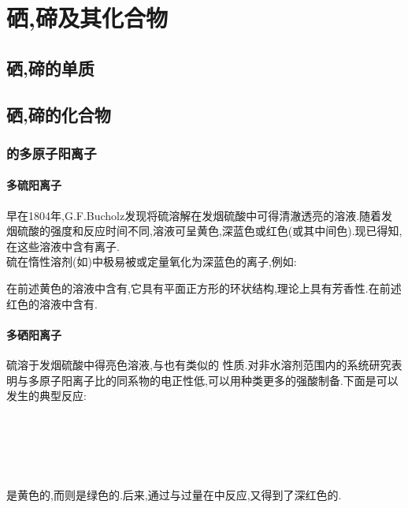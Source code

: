 \documentclass{ctexart}
\begin{document}
\section{硒,碲及其化合物}
\subsection{硒,碲的单质}
\subsection{硒,碲的化合物}
\subsubsection{的多原子阳离子}
\paragraph{多硫阳离子}早在1804年,G.F.Bucholz发现将硫溶解在发烟硫酸中可得清澈透亮的溶液.随着发烟硫酸的强度和反应时间不同,溶液可呈黄色,深蓝色或红色(或其中间色).现已得知,在这些溶液中含有离子.\\
\indent 硫在惰性溶剂(如)中极易被或定量氧化为深蓝色的离子,例如:
\begin{center}
\end{center}
在前述黄色的溶液中含有,它具有平面正方形的环状结构,理论上具有芳香性.在前述红色的溶液中含有.
\paragraph{多硒阳离子}
硫溶于发烟硫酸中得亮色溶液,与也有类似的
性质.对非水溶剂范围内的系统研究表明与多原子阳离子比的同系物的电正性低,可以用种类更多的强酸制备.下面是可以发生的典型反应:
\begin{center}
    \\
    \\
    \\
    \\
\end{center}
\indent {}是黄色的,而则是绿色的.后来,通过与过量在中反应,又得到了深红色的.
\end{document}
